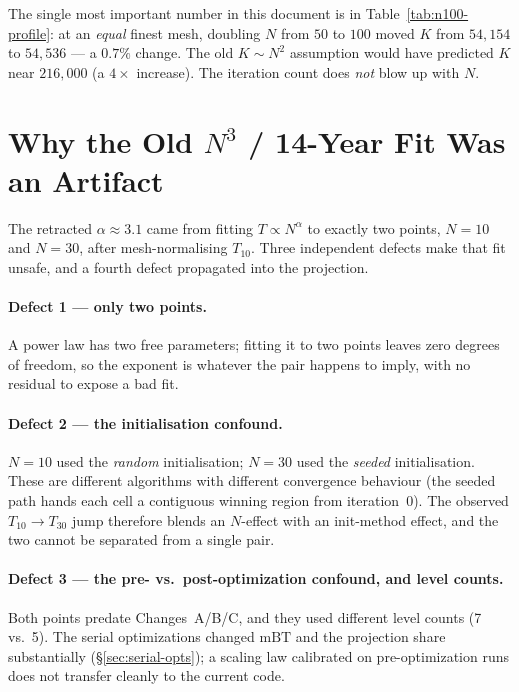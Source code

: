\documentclass[11pt,a4paper]{article}
\begin{document}
The single most important number in this document is in
Table~\ref{tab:n100-profile}: at an \emph{equal} finest mesh, doubling $N$ from
$50$ to $100$ moved $K$ from $54{,}154$ to $54{,}536$ --- a $0.7\%$ change.  The
old $K\sim N^2$ assumption would have predicted $K$ near $216{,}000$
(a $4\times$ increase).  The iteration count does \emph{not} blow up with $N$.

\section{Why the Old $N^3$ / 14-Year Fit Was an Artifact}
\label{sec:why-old-fit-wrong}

The retracted $\alpha\approx3.1$ came from fitting $T\propto N^{\alpha}$ to
exactly two points, $N=10$ and $N=30$, after mesh-normalising $T_{10}$.  Three
independent defects make that fit unsafe, and a fourth defect propagated into
the projection.

\paragraph{Defect 1 --- only two points.}
A power law has two free parameters; fitting it to two points leaves zero
degrees of freedom, so the exponent is whatever the pair happens to imply, with
no residual to expose a bad fit.

\paragraph{Defect 2 --- the initialisation confound.}
$N=10$ used the \emph{random} initialisation; $N=30$ used the \emph{seeded}
initialisation.  These are different algorithms with different convergence
behaviour (the seeded path hands each cell a contiguous winning region from
iteration~0).  The observed $T_{10}\to T_{30}$ jump therefore blends an
$N$-effect with an init-method effect, and the two cannot be separated from a
single pair.

\paragraph{Defect 3 --- the pre- vs.\ post-optimization confound, and level
counts.}
Both points predate Changes~A/B/C, and they used different level counts (7 vs.\
5).  The serial optimizations changed $\mathrm{mBT}$ and the projection share
substantially (\S\ref{sec:serial-opts}); a scaling law calibrated on
pre-optimization runs does not transfer cleanly to the current code.
\end{document}
